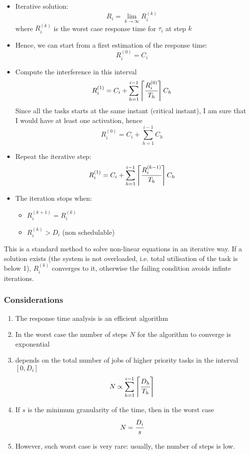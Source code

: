 \begin{itemize}
\item Iterative solution:
\[R_i = \lim_{k\to\infty} R_i^{(k)}\]
where $R_i^{(k)}$ is the worst case response time for $\tau_i$ at step $k$
\item Hence, we can start from a first estimation of the response time:
\[R_{i}^{(0)} = C_i\]
\item Compute the interference in this interval
\[R_{i}^{(1)} = C_i + \sum_{h=1}^{i-1}\left\lceil \cfrac{R_{i}^{(0)}}{T_h} \right\rceil C_h\]
Since all the tasks starts at the same instant (critical instant), I am sure that I would have at least one activation, hence
\[R_i^{(0)} = C_i + \sum_{h=1}^{i-1} C_h\]
\item Repeat the iterative step:
\[R_{i}^{(1)} = C_i + \sum_{h=1}^{i-1}\left\lceil \cfrac{R_{i}^{(k-1)}}{T_h} \right\rceil C_h\]
\item The iteration stops when:
\begin{itemize}
\item $R_i^{(k+1)} = R_i^{(k)}$
\item $R_i^{(k)} > D_i$ (non schedulable)
\end{itemize}
\end{itemize}

This is a standard method to solve non-linear equations in an iterative way. If a solution exists (the system is not overloaded, i.e. total utilisation of the task is below 1), $R_i^{(k)}$ converges to it, otherwise the failing condition avoids infinte iterations.

\subsubsection{Considerations}
\begin{enumerate}
\item The response time analysis is an efficient algorithm
\item In the worst case the number of steps $N$ for the algorithm to converge is exponential
\item depends on the total number of jobs of higher priority tasks in the interval $[0, D_i]$
\[N \propto \sum_{h=1}^{i-1}\left\lceil \cfrac{D_h}{T_h} \right\rceil\]
\item If $s$ is the minimum granularity of the time, then in the worst case 
\[N = \cfrac{D_i}{s}\]
\item However, such worst case is very rare: usually, the number of steps is low.
\end{enumerate}














